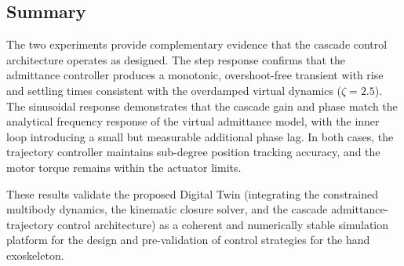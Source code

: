 \subsection{Summary}
The two experiments provide complementary evidence that the cascade control architecture operates as designed. The step response confirms that the admittance controller produces a monotonic, overshoot-free transient with rise and settling times consistent with the overdamped virtual dynamics ($\zeta = 2.5$). The sinusoidal response demonstrates that the cascade gain and phase match the analytical frequency response of the virtual admittance model, with the inner loop introducing a small but measurable additional phase lag. In both cases, the trajectory controller maintains sub-degree position tracking accuracy, and the motor torque remains within the actuator limits.
 
These results validate the proposed Digital Twin (integrating the constrained multibody dynamics, the kinematic closure solver, and the cascade admittance-trajectory control architecture) as a coherent and numerically stable simulation platform for the design and pre-validation of control strategies for the hand exoskeleton.